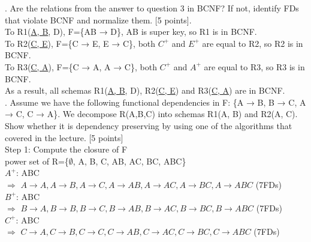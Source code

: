 \documentclass[]{article}
\begin{document}
	. Are the relations from the answer to question 3 in BCNF? If not, identify FDs that violate BCNF and normalize them. [5 points].   \\
	
	\noindent To R1(\underline{A, B}, D), F=\{AB → D\}, AB is super key, so R1 is in BCNF. \\
	
	\noindent To R2(\underline{C, E}), F=\{C → E, E → C\}, both $C^{+}$ and $E^{+}$ are equal to R2, so R2 is in BCNF.  \\
	
	\noindent To R3(\underline{C, A}), F=\{C → A, A → C\}, both $C^{+}$ and $A^{+}$ are equal to R3, so R3 is in BCNF.  \\
	
	\noindent As a result, all schemas R1(\underline{A, B}, D), R2(\underline{C, E}) and R3(\underline{C, A}) are in BCNF.  \\
	
	. Assume we have the following functional dependencies in F: \{A → B, B → C, A → C, C → A\}. We decompose R(A,B,C) into schemas R1(A, B) and R2(A, C). Show whether it is dependency preserving by using one of the algorithms that covered in the lecture. [5 points]   \\
	
	\noindent Step 1: Compute the closure of F  \\
	
	power set of R=\{$\emptyset$, A, B, C, AB, AC, BC, ABC\} \\
	
	$A^{+}$: ABC  \\
	
	$\Longrightarrow$ $A\rightarrow A, A\rightarrow B, A\rightarrow C, A\rightarrow AB, A\rightarrow AC, A\rightarrow BC, A\rightarrow ABC$ (7FDs)  \\
	
	$B^{+}$: ABC  \\
	
	$\Longrightarrow$ $B\rightarrow A, B\rightarrow B, B\rightarrow C, B\rightarrow AB, B\rightarrow AC, B\rightarrow BC, B\rightarrow ABC$ (7FDs)  \\
	
	$C^{+}$: ABC  \\
	
	$\Longrightarrow$ $C\rightarrow A, C\rightarrow B, C\rightarrow C, C\rightarrow AB, C\rightarrow AC, C\rightarrow BC, C\rightarrow ABC$ (7FDs)  \\
	
\end{document}
